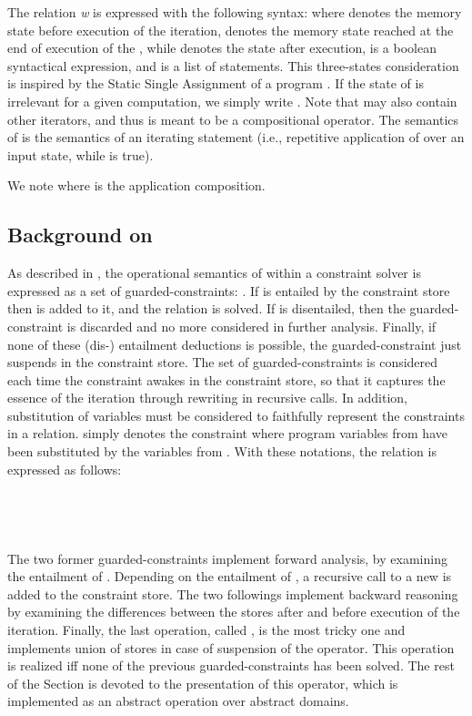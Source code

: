 \documentclass[submission,copyright,creativecommons]{eptcs}
\begin{document}
\noindent
The relation {\it w} is expressed with the following syntax:
 where  denotes the memory state before execution of the iteration,  denotes the memory state reached at the end of execution of the , while  denotes the state after execution,  is a boolean syntactical expression, and  is a list of statements. This three-states consideration is inspired by the Static Single Assignment of a program \cite{WZ91}. If the state of  is irrelevant for a given computation, we simply write . Note that  may also contain other iterators, and thus  is meant to be a compositional operator. The semantics of  is the semantics of an iterating statement (i.e., repetitive application of  over an input state, while  is true).

\noindent
We note  where  is the application composition.

\subsection{Background on }
As described in \cite{GBR00},
the operational semantics of  within a constraint solver is expressed as a set of guarded-constraints: . If  is entailed by the constraint store then  is added to it, and the relation  is solved. If  is disentailed, then the guarded-constraint is discarded and no more considered in further analysis. Finally, if none of these (dis-) entailment deductions is possible, the guarded-constraint just suspends in the constraint store. The set of guarded-constraints is considered each time the constraint  awakes in the constraint store, so that it captures the essence of the iteration through rewriting in recursive calls. In addition, substitution of variables must be considered to faithfully represent the constraints in a  relation.  simply denotes the constraint  where program variables from  have been substituted by the variables from . With these notations, the  relation is expressed as follows:\\
\\ \\
\\
\\
\noindent
The two former guarded-constraints implement forward analysis, by examining the entailment of . Depending on the entailment of , a recursive call to a new  is added to the constraint store. The two followings implement backward reasoning by examining the differences between the stores after and before execution of the iteration. Finally,  the last operation, called , is the most tricky one and implements union of stores in case of suspension of the operator. This  operation is realized iff none of the previous guarded-constraints has been solved.
The rest of the Section is devoted to the presentation of this operator, which is implemented as an abstract operation over abstract domains. 
\end{document}
